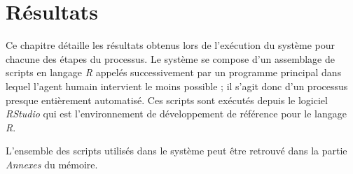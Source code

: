 \chapter{Résultats}
Ce chapitre détaille les résultats obtenus lors de l'exécution du système pour chacune des étapes du processus. Le système se compose d'un assemblage de scripts en langage \textit{R} appelés successivement par un programme principal dans lequel l'agent humain intervient le moins possible ; il s'agit donc d'un processus presque entièrement automatisé. Ces scripts sont exécutés depuis le logiciel \textit{RStudio} qui est l'environnement de développement de référence pour le langage \textit{R}.

L'ensemble des scripts utilisés dans le système peut être retrouvé dans la partie \textit{Annexes} du mémoire.
